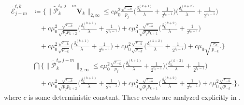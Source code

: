 \documentclass[10pt]{article}
\newcommand{\0}{{\mathbf{0}}}
\newcommand{\1}{{\mathbf{1}}}
\renewcommand{\citet}{\cite}
\newcommand{\dl}{\delta_{\mathrm{L}}}
\renewcommand{\tilde}{\widetilde}
\begin{document}
\begin{align*}
        \mathcal{\tilde E}_{j-m}^{t,k} &\coloneqq \Bigg\{ \|\mathcal{\tilde P}_k^{t_0,j-m}  \mathbf{V}_k \|_{2,\infty} \leq c \mu_0^2 \frac{\sqrt{r_{-k}}}{p_j} \bigg( \frac{\dl^{(k+1)}}{\lambda} + \frac{1}{2^{t_0-1}}\bigg)\bigg( \frac{\dl^{(k+2)}}{\lambda} + \frac{1}{2^{t_0-1}}\bigg) \\
     &\quad + c \mu_0^2 \frac{\sqrt{r_{-k}}}{\sqrt{p_jp_{k+2}}} \bigg( \frac{\dl^{(k+1)}}{\lambda} + \frac{1}{2^{t_0-1}} \bigg) + c \mu_0^2 \frac{\sqrt{r_{-k}}}{\sqrt{p_j p_{k+1}}} \bigg( \frac{\dl^{(k+2)}}{\lambda} + \frac{1}{2^{t_0-1}} \bigg)\\
     &\quad + c \mu_0^2 \frac{\sqrt{r_{-k}}}{\sqrt{p_{-k}}} \bigg( \frac{\dl^{(k+1)}}{\lambda} + \frac{1}{2^{t_0-1}} \bigg) + c\mu_0^2 \frac{\sqrt{r_{-k}}}{\sqrt{p_{-k}}} \bigg( \frac{\dl^{(k+2)}}{\lambda} + \frac{1}{2^{t_0-1}} \bigg) + c \mu_0 \sqrt{\frac{r_k}{p_{-k}}}.\Bigg\} \\
     &\bigcap \Bigg\{ \|\mathcal{\tilde P}_k^{t_0,j-m}   \|_{2,\infty} \leq c \mu_0^2 \frac{\sqrt{r_{-k}}}{p_j}  \bigg( \frac{\dl^{(k+1)}}{\lambda} + \frac{1}{2^{t_0-1}} \bigg)  \bigg( \frac{\dl^{(k+2)}}{\lambda} + \frac{1}{2^{t_0-1}} \bigg) \\
    &\quad +  c\mu_0^2 \frac{\sqrt{r_{-k}}}{\sqrt{p_jp_{k+2}}} \bigg( \frac{\dl^{(k+1)}}{\lambda} + \frac{1}{2^{t_0-1}} \bigg) + c\mu_0^2 \frac{\sqrt{r_{-k}}}{\sqrt{p_jp_{k+1}}} \bigg( \frac{\dl^{(k+2)}}{\lambda} + \frac{1}{2^{t_0-1}} \bigg) + c\mu_0^2 \frac{\sqrt{r_{-k}}}{\sqrt{p_{-k}}}.\Bigg\},
  \end{align*}
  where $c$ is some deterministic constant.  These events are analyzed explicitly in \citet{agterberg_estimating_2022}. 
\end{document}
